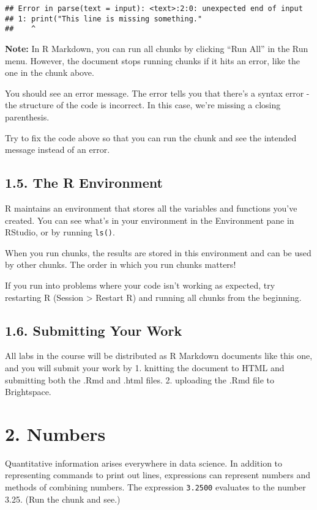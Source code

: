 \documentclass[
]{article}
\begin{document}
\begin{verbatim}
## Error in parse(text = input): <text>:2:0: unexpected end of input
## 1: print("This line is missing something."
##    ^
\end{verbatim}

\textbf{Note:} In R Markdown, you can run all chunks by clicking ``Run
All'' in the Run menu. However, the document stops running chunks if it
hits an error, like the one in the chunk above.

You should see an error message. The error tells you that there's a
syntax error - the structure of the code is incorrect. In this case,
we're missing a closing parenthesis.

Try to fix the code above so that you can run the chunk and see the
intended message instead of an error.

\subsection{1.5. The R Environment}\label{the-r-environment}

R maintains an environment that stores all the variables and functions
you've created. You can see what's in your environment in the
Environment pane in RStudio, or by running \texttt{ls()}.

When you run chunks, the results are stored in this environment and can
be used by other chunks. The order in which you run chunks matters!

If you run into problems where your code isn't working as expected, try
restarting R (Session \textgreater{} Restart R) and running all chunks
from the beginning.

\subsection{1.6. Submitting Your Work}\label{submitting-your-work}

All labs in the course will be distributed as R Markdown documents like
this one, and you will submit your work by 1. knitting the document to
HTML and submitting both the .Rmd and .html files. 2. uploading the .Rmd
file to Brightspace.

\section{2. Numbers}\label{numbers}

Quantitative information arises everywhere in data science. In addition
to representing commands to print out lines, expressions can represent
numbers and methods of combining numbers. The expression \texttt{3.2500}
evaluates to the number 3.25. (Run the chunk and see.)
\end{document}
